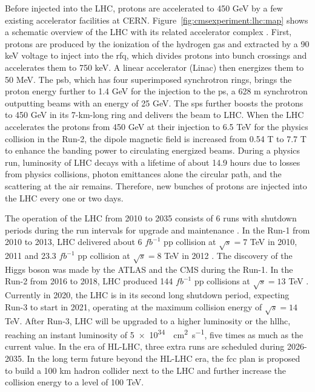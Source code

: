 Before injected into the LHC, protons are accelerated to 450 GeV by a few existing accelerator facilities at CERN. Figure~\ref{fig:cmsexperiment:lhc:map} shows a schematic overview of the LHC with its related accelerator complex  \cite{exhep:lhcInject:Benedikt:2004wm}. First, protons are produced by the ionization of the hydrogen gas and extracted by a 90 keV voltage to inject into the \acrfull{rfq}, which divides protons into bunch crossings and accelerates them to 750 keV. A linear accelerator (Linac) then energizes them to 50 MeV. The \acrfull{psb}, which has four superimposed synchrotron rings, brings the proton energy further to 1.4 GeV for the injection to the \acrfull{ps}, a 628 m synchrotron outputting beams with an energy of 25 GeV. The \acrfull{sps} further boosts the protons to 450 GeV in its 7-km-long ring and delivers the beam to LHC. When the LHC accelerates the protons from 450 GeV at their injection to 6.5 TeV for the physics collision in the Run-2, the dipole magnetic field is increased from 0.54 T to 7.7 T to enhance the banding power to circulating energized beams. During a physics run, luminosity of LHC decays with a lifetime of about 14.9 hours \cite{exhep:lhc:Evans:2008zzb} due to losses from physics collisions, photon emittances alone the circular path, and the scattering at the air remains. Therefore, new bunches of protons are injected into the LHC every one or two days.



The operation of the LHC from 2010 to 2035 consists of 6 runs with shutdown periods during the run intervals for upgrade and maintenance . In the Run-1 from 2010 to 2013, LHC delivered about 6 $fb^{-1}$ pp collision at $\sqrt{s}=7$ TeV in 2010, 2011 and 23.3 $fb^{-1}$ pp collision at $\sqrt{s}=8$ TeV in 2012 \cite{cms:publicLumiInfo}. The discovery of the Higgs boson was made by the ATLAS \cite{exhep:atlasHiggsDisc:Aad:2012tfa} and the CMS \cite{exhep:cmsHiggsDisc:Chatrchyan:2012ufa} during the Run-1. In the Run-2 from 2016 to 2018, LHC produced 144 $fb^{-1}$ pp collisions at $\sqrt{s}=13$ TeV \cite{cms:publicLumiInfo}. Currently in 2020, the LHC is in its second long shutdown period, expecting Run-3 to start in 2021, operating at the maximum collision energy of $\sqrt{s}=14$ TeV. After Run-3, LHC will be upgraded to a higher luminosity or the \acrfull{hllhc}, reaching an instant luminosity of \SI{5e34}{\per\cm\squared \per\s}, five times as much as the current value. In the era of HL-LHC, three extra runs are scheduled during 2026-2035. In the long term future beyond the HL-LHC era, the \acrfull{fcc} \cite{exhep:fcc:Benedikt:2715354} plan is proposed to build a 100 km hadron collider next to the LHC and further increase the collision energy to a level of 100 TeV.